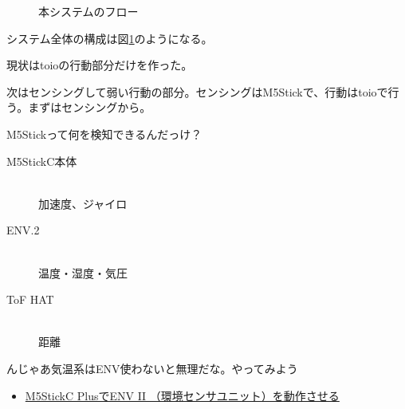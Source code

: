 \documentclass[twocolumn]{mynote}
\begin{document}
\fboxsep=0pt            %
\fboxrule=1pt            %
\begin{figure}[h]
  \centering
  \caption{本システムのフロー}
  \label{fig:weak-toio-system-flow}
\end{figure}

システム全体の構成は図\ref*{fig:weak-toio-system-flow}のようになる。

現状はtoioの行動部分だけを作った。

次はセンシングして弱い行動の部分。センシングはM5Stickで、行動はtoioで行う。まずはセンシングから。

M5Stickって何を検知できるんだっけ？

\begin{description}
  \item[M5StickC本体]\mbox{}\\
    加速度、ジャイロ
  \item[ENV.2]\mbox{}\\
    温度・湿度・気圧
  \item[ToF HAT]\mbox{}\\
    距離
\end{description}

んじゃあ気温系はENV使わないと無理だな。やってみよう

\begin{itemize}
  \item \href{https://qiita.com/visyeii/items/e28f8500f43166710664}{M5StickC PlusでENV II （環境センサユニット）を動作させる}
\end{itemize}
\end{document}
